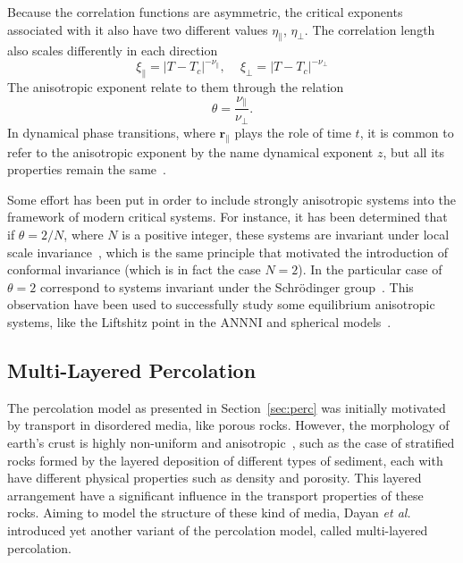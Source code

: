Because the correlation functions are asymmetric, the critical exponents
associated with it also have two different values $\eta_\parallel$,
$\eta_\perp$. The correlation length also scales differently in each direction
\begin{equation}
    \xi_{\parallel}=
    \left|T-T_{c}\right|^{-\nu_{\parallel}},
    \,\,\,\,\,\,\,
    \xi_{\perp}=\left|T-T_{c}\right|^{-\nu_{\perp}}
\end{equation}
The anisotropic exponent relate to them through the relation
\begin{equation}
    \theta = \frac{\nu_\parallel}{\nu_\perp}.
\end{equation}
In dynamical phase transitions, where $\mathbf{r}_\parallel$ plays the role of
time $t$, it is common to refer to the anisotropic exponent by the name
dynamical exponent $z$, but all its properties remain the
same~\cite{Henkel1994}.

Some effort has been put in order to include strongly anisotropic systems into
the framework of modern critical systems. For instance, it has been determined
that if $\theta=2/N$, where $N$ is a positive integer, these systems are invariant
under local scale invariance~\cite{Henkel2003}, which is the same principle
that motivated the introduction of conformal invariance (which is in fact the
case $N=2$). In the particular case of $\theta=2$ correspond to systems invariant
under the Schr\"odinger group~\cite{Henkel1992}. This observation have been
used to successfully study some equilibrium anisotropic systems, like the
Liftshitz point in the ANNNI and spherical models~\cite{Henkel2010}.


\subsection{Multi-Layered Percolation}
\label{sec:mlp}

The percolation model as presented in Section~\ref{sec:perc} was initially
motivated by transport in disordered media, like porous rocks. However, the
morphology of earth's crust is highly non-uniform and
anisotropic~\cite{Englman1986}, such as the case of stratified rocks formed by
the layered deposition of different types of sediment, each with have different
physical properties such as density and porosity. This layered arrangement have
a significant influence in the transport properties of these rocks. Aiming to
model the structure of these kind of media, Dayan \textit{et
al.}~\cite{Dayan1991} introduced yet another variant of the percolation
model, called multi-layered percolation. 


